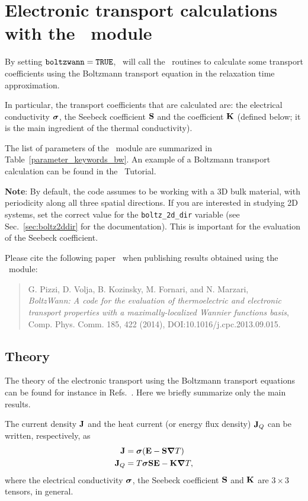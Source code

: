 \chapter{Electronic transport calculations with the \bw\ module}\label{ch:boltzwann}

By setting $\verb#boltzwann#=\verb#TRUE#$, \postw\ will call the \bw\ routines to calculate some transport coefficients using the Boltzmann transport equation in the relaxation time approximation.

In particular, the transport coefficients that are calculated are: the electrical conductivity $\bm{\mathrm{\sigma}}$, the Seebeck coefficient $\bm{\mathrm{S}}$ and the coefficient $\bm{\mathrm{K}}$ (defined below; it is the main ingredient of the thermal conductivity). 

The list of parameters of the \bw\ module are summarized in Table~\ref{parameter_keywords_bw}. 
An example of a Boltzmann transport calculation can be found in the \wannier\ Tutorial. 

\textbf{Note}: By default, the code assumes to be working with a 3D bulk material, with periodicity along all three spatial directions. If you are interested in studying 2D systems, set the correct value for the \texttt{boltz\_2d\_dir} variable (see Sec.~\ref{sec:boltz2ddir} for the documentation). This is important for the evaluation of the Seebeck coefficient.

Please cite the following paper~\cite{pizzi-cpc14} when publishing results obtained using the \bw\  module:
\begin{quote}
G. Pizzi, D. Volja, B. Kozinsky, M. Fornari, and N. Marzari, \\
\emph{BoltzWann: A code for the evaluation of thermoelectric and electronic transport properties with a maximally-localized Wannier functions basis},\\
Comp. Phys. Comm. 185, 422 (2014), DOI:10.1016/j.cpc.2013.09.015.
\end{quote}

\section{Theory}
\label{sec:boltzwann-theory}
The theory of the electronic transport using the Boltzmann transport equations can be found for instance in Refs.~\cite{ziman-book72,grosso-book00,mahan-itc06}. Here we briefly summarize only the main results. 

The current density $\bm{\mathrm{J}}$ and the heat current (or energy flux density) $\bm{\mathrm{J}}_Q$ can be written, respectively, as
\begin{align}
  \bm{\mathrm{J}}   &= \bm{\mathrm{\sigma}}(\bm{\mathrm{E}} - \bm{\mathrm{S}} \bm{\mathrm{\nabla}} T) \\
  \bm{\mathrm{J}}_Q &= T \bm{\mathrm{\sigma}} \bm{\mathrm{S}} \bm{\mathrm{E}} - \bm{\mathrm{K}} \bm{\mathrm{\nabla}} T,
\end{align}
where the electrical conductivity $\bm{\mathrm{\sigma}}$, the Seebeck coefficient $\bm{\mathrm{S}}$ and $\bm{\mathrm{K}}$ are $3\times 3$ tensors, in general.

